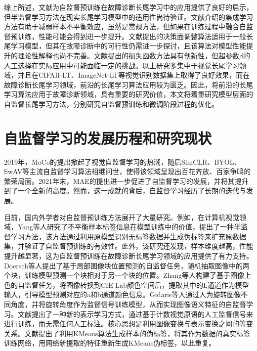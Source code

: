 \documentclass[master]{thesis-uestc}
\begin{document}
综上所述，文献\cite{yang2020rethinking}为自监督预训练在故障诊断长尾学习中的应用提供了良好的启示，但半监督学习方法在现实长尾学习模型中的适用性尚待验证。文献\cite{wu2023personalized,吴亮2023基于多级学习的长尾分布下交通多目标检测}介绍的集成学习方法有助于减弱样本不平衡效应，虽然是常规方法，但如果在训练过程中融合自监督预训练，性能可能会得到进一步提升。文献\cite{wang2023margin}提出的决策面调整算法适用于一般长尾学习模型，但其在故障诊断中的可行性仍需进一步探讨，且该算法对模型性能提升的理论性解释也尚不完善。文献\cite{cui2019class}提出的损失函数方法具有创新性，但超参数$\beta$的人工选择在实际应用中可能面临一定的挑战。以上研究多集中于视觉长尾学习领域，并且在CIFAR-LT、ImageNet-LT等视觉识别数据集上取得了良好效果，而在故障诊断长尾学习领域，前沿的长尾学习算法应用较为匮乏。因此，将前沿的长尾学习算法应用于故障诊断领域，具有重要的研究价值，本文将着重研究模型层面的自监督长尾学习方法，分别研究自监督预训练和微调阶段过程的优化。
\FloatBarrier  %
\section{自监督学习的发展历程和研究现状}

2019年，MoCo的提出掀起了视觉自监督学习的热潮，随后SimCLR、BYOL、SwAV等主流自监督学习算法相继问世，使得该领域呈现出百花齐放、百家争鸣的繁荣局面。2021年末，MAE的提出进一步促进了自监督学习的发展，并将其提升到了一个全新的高度。然而，这一成就的背后，自监督学习经历了长期的迭代与发展。

目前，国内外学者对自监督预训练方法展开了大量研究。例如，在计算机视觉领域，Yang等人研究了不平衡样本标签信息在模型训练中的价值，提出了一种半监督学习方法，该方法通过利用原模型识别无标签数据并生成伪标签来扩充原数据集，并验证了自监督预训练的有效性。此外，该研究还发现，样本维度越高，性能提升越显著，这为自监督预训练在故障诊断长尾学习领域的应用提供了有力支持。Doersch等人提出了基于局部图像块位置预测的自监督任务，随机抽取图像中的两个块，训练模型预测一个块相对于另一个块的位置。Zhang等人构建了基于图像上色的自监督任务，将图像转换到CIE Lab颜色空间后，提取其中的L通道作为模型输入，引导模型预测对应的a和b通道颜色信息。Gidaris等人通过人为旋转图像不同角度，并将旋转角度作为监督信号训练模型，从而实现图像语义特征的自监督学习。文献\cite{noroozi2017representation}提出了一种新的表示学习方式，通过基于计数视觉原语的人工监督信号来进行训练，而无需任何人工标注。核心思想是利用图像变换与表示变换之间的等变关系。文献\cite{caron2018deep}提出了利用KMeans算法生成样本的伪标签，将其作为数据的真实标签训练网络，用网络新提取的特征重新生成KMeans伪标签，以此重复。
\end{document}
